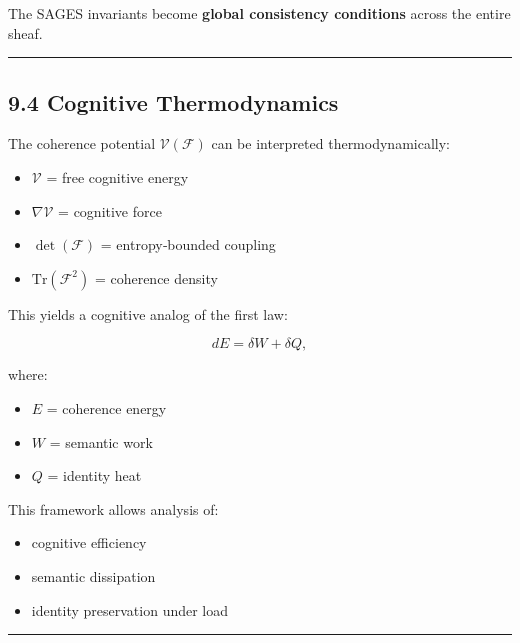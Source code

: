 The SAGES invariants become \textbf{global consistency conditions} across the entire sheaf.

\begin{center}\rule{0.5\linewidth}{0.5pt}\end{center}

\subsection{9.4 Cognitive Thermodynamics}\label{cognitive-thermodynamics}

The coherence potential \(\mathcal{V}(\mathcal{F})\) can be interpreted thermodynamically:

\begin{itemize}
\tightlist
\item
  \(\mathcal{V}\) = free cognitive energy\\
\item
  \(\nabla \mathcal{V}\) = cognitive force\\
\item
  \(\det(\mathcal{F})\) = entropy‑bounded coupling\\
\item
  \(\text{Tr}(\mathcal{F}^2)\) = coherence density
\end{itemize}

This yields a cognitive analog of the first law:

\[
dE = \delta W + \delta Q,
\]

where:

\begin{itemize}
\tightlist
\item
  \(E\) = coherence energy\\
\item
  \(W\) = semantic work\\
\item
  \(Q\) = identity heat
\end{itemize}

This framework allows analysis of:

\begin{itemize}
\tightlist
\item
  cognitive efficiency\\
\item
  semantic dissipation\\
\item
  identity preservation under load
\end{itemize}

\begin{center}\rule{0.5\linewidth}{0.5pt}\end{center}

